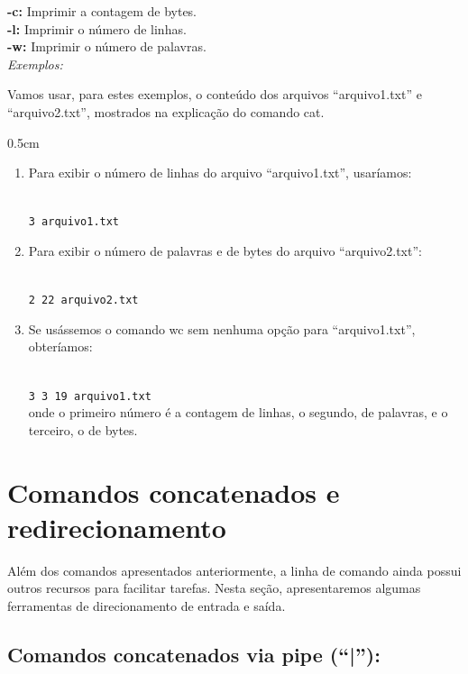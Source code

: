 \begin{refsection}
	\indent\indent\textbf{-c:} Imprimir a contagem de bytes.\\
	\indent\indent\textbf{-l:} Imprimir o número de linhas.\\
	\indent\indent\textbf{-w:} Imprimir o número de palavras.\\


\textit{Exemplos:}

Vamos usar, para estes exemplos, o conteúdo dos arquivos ``arquivo1.txt'' e ``arquivo2.txt'', mostrados na explicação do comando cat.  

\begin {myindentpar}{0.5cm}
\begin{enumerate}[\itshape i.]
\item{Para exibir o número de linhas do arquivo ``arquivo1.txt'', usaríamos:}

\\
\texttt{3 arquivo1.txt}\\
\item{Para exibir o número de palavras e de bytes do arquivo ``arquivo2.txt'':}

\\
\texttt{2 22 arquivo2.txt}\\
\item{Se usássemos o comando wc sem nenhuma opção para ``arquivo1.txt'', obteríamos:}

\\
\texttt{3 3 19 arquivo1.txt}\\

onde o primeiro número é a contagem de linhas, o segundo, de palavras, e o terceiro, o de bytes.\\

\end{enumerate}
\end{myindentpar}

\section{Comandos concatenados e redirecionamento}\label{tut1:pipered}

Além dos comandos apresentados anteriormente, a linha de comando ainda possui outros recursos para facilitar tarefas. Nesta seção, apresentaremos algumas ferramentas de direcionamento de entrada e saída.\\

\subsection{Comandos concatenados via pipe (``|''):}\label{tut1:pipered:pipe}


\end{refsection}
